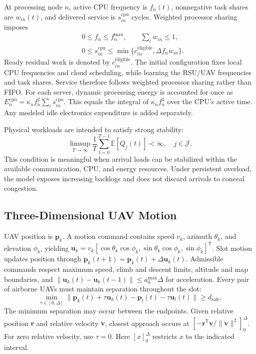\documentclass[journal]{IEEEtran}
\begin{document}
At processing node $n$, active CPU frequency is $f_n(t)$, nonnegative task shares are $w_{in}(t)$, and delivered service is $s_{in}^{\mathrm{cpu}}$ cycles. Weighted processor sharing imposes
\begin{equation}
\begin{aligned}
&0\le f_n\le f_n^{\max},\qquad \sum_i w_{in}\le1,\\
&0\le s_{in}^{\mathrm{cpu}}\le
 \min\{c_{in}^{\mathrm{eligible}},\Delta f_nw_{in}\}.
\end{aligned}
\label{eq:cpu_capacity}
\end{equation}
Ready residual work is denoted by $c_{in}^{\mathrm{eligible}}$. The initial configuration fixes local CPU frequencies and cloud scheduling, while learning the RSU/UAV frequencies and task shares. Service therefore follows weighted processor sharing rather than FIFO. For each server, dynamic processing energy is accounted for once as $E_n^{\mathrm{cpu}}=\kappa_n f_n^2\sum_i s_{in}^{\mathrm{cpu}}$. This equals the integral of $\kappa_n f_n^3$ over the CPU's active time. Any modeled idle electronics expenditure is added separately.

Physical workloads are intended to satisfy strong stability:
\begin{equation}
\limsup_{T\to\infty}\frac1T\sum_{t=0}^{T-1}
 \mathbb E[Q_j(t)]<\infty,\quad j\in\mathcal J.
\label{eq:stability}
\end{equation}
This condition is meaningful when arrival loads can be stabilized within the available communication, CPU, and energy resources. Under persistent overload, the model exposes increasing backlogs and does not discard arrivals to conceal congestion.

\subsection{Three-Dimensional UAV Motion}
UAV position is $\boldsymbol p_k$. A motion command contains speed $v_k$, azimuth $\theta_k$, and elevation $\phi_k$, yielding $\boldsymbol u_k=v_k[\cos\theta_k\cos\phi_k,\sin\theta_k\cos\phi_k,\sin\phi_k]^{\mathsf T}$. Slot motion updates position through $\boldsymbol p_k(t+1)=\boldsymbol p_k(t)+\Delta\boldsymbol u_k(t)$. Admissible commands respect maximum speed, climb and descent limits, altitude and map boundaries, and $\|\boldsymbol u_k(t)-\boldsymbol u_k(t-1)\|\le a_k^{\max}\Delta$ for acceleration.
Every pair of airborne UAVs must maintain separation throughout the slot:
\begin{equation}
\min_{\tau\in[0,\Delta]}
\|\boldsymbol p_k(t)+\tau\boldsymbol u_k(t)
 -\boldsymbol p_l(t)-\tau\boldsymbol u_l(t)\|
\ge d_{\mathrm{safe}}.
\label{eq:collision}
\end{equation}
The minimum separation may occur between the endpoints. Given relative position $\boldsymbol r$ and relative velocity $\boldsymbol v$, closest approach occurs at $[-\boldsymbol r^{\mathsf T}\boldsymbol v/\|\boldsymbol v\|^2]_0^\Delta$. For zero relative velocity, use $\tau=0$. Here $[x]_0^\Delta$ restricts $x$ to the indicated interval.
\end{document}

